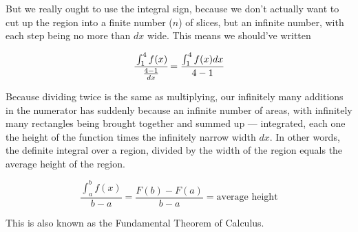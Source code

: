 But we really ought to use the integral sign, because we don't actually want to cut up the region into
a finite number ($n$) of slices, but an infinite number, with each step being no more than $dx$ wide.
This means we should've written

$$
\cfrac{\int_1^4 f(x)}{\frac{4-1}{dx}} = \frac{\int_1^4 f(x)dx}{4-1}
$$

Because dividing twice is the same as multiplying, our infinitely many additions in the numerator
has suddenly because an infinite number of areas, with infinitely many rectangles being brought
together and summed up --- integrated, each one the height of the function times the infinitely
narrow width $dx$.  In other words, the definite integral over a region, divided by the width of
the region equals the average height of the region.

$$
\frac{\int_a^b f(x)}{b-a} = \frac{F(b)-F(a)}{b-a} = \text{average height}
$$

This is also known as the Fundamental Theorem of Calculus.